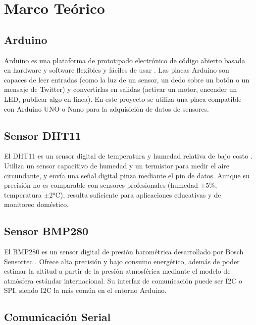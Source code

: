 \documentclass[12pt,a4paper]{report}
\begin{document}
\chapter{Marco Teórico}
\label{ch:marco-teorico}

\section{Arduino}
\label{sec:arduino}

Arduino es una plataforma de prototipado electrónico de código abierto basada en hardware y software flexibles y fáciles de usar \cite{arduino2024}. Las placas Arduino son capaces de leer entradas (como la luz de un sensor, un dedo sobre un botón o un mensaje de Twitter) y convertirlas en salidas (activar un motor, encender un LED, publicar algo en línea). En este proyecto se utiliza una placa compatible con Arduino UNO o Nano para la adquisición de datos de sensores.

\section{Sensor DHT11}
\label{sec:dht11}

El DHT11 es un sensor digital de temperatura y humedad relativa de bajo costo \cite{dht11datasheet}. Utiliza un sensor capacitivo de humedad y un termistor para medir el aire circundante, y envía una señal digital pinza mediante el pin de datos. Aunque su precisión no es comparable con sensores profesionales (humedad $\pm$5\%, temperatura $\pm$2°C), resulta suficiente para aplicaciones educativas y de monitoreo doméstico.

\section{Sensor BMP280}
\label{sec:bmp280}

El BMP280 es un sensor digital de presión barométrica desarrollado por Bosch Sensortec \cite{bmp280datasheet}. Ofrece alta precisión y bajo consumo energético, además de poder estimar la altitud a partir de la presión atmosférica mediante el modelo de atmósfera estándar internacional. Su interfaz de comunicación puede ser I2C o SPI, siendo I2C la más común en el entorno Arduino.

\section{Comunicación Serial}
\label{sec:comunicacion-serial}
\end{document}
